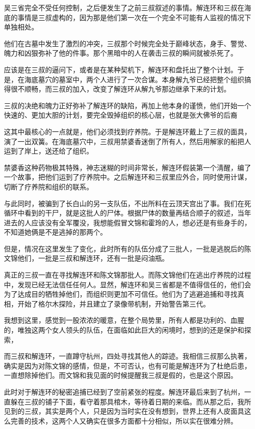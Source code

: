 吴三省完全不受任何控制，之后便发生了之前三叔叙述的事情。解连环和三叔在海底的事情是三叔虚构的，因为那是他们第一次在一个完全不可能有人监视的情况下单独相处。

他们在古墓中发生了激烈的冲突，三叔那个时候完全处于巅峰状态，身手、警觉、魄力和凶狠弥补了他的件事。那个黑暗中的人在袭击三叔的瞬间就被杀死了。

应该是在三叔的逼问下，或者是在某种契机下，解连环和盘托出了整个计划。于是，在海底墓穴的墓室中，两个人进行了一次合谋。本身解九爷已经把整个组织搞得很不顺畅，而三叔的加入，改变了解连环从解九爷那边继承下来的计划。

三叔的决绝和魄力正好弥补了解连环的缺陷，再加上他本身的谨愤，他们开始一个快速的、更加大胆的计划，要完全毁掉组织的核心层，也就是张大佛爷的后裔

这其中最核心的一点就是，他们必须找到疗养院。于是解连环戴上了三叔的面具，演了一出双簧。在海底墓穴中，三叔用禁婆香迷倒了所有人，然后用解家的船把人运到了岸上，送还给了组织。

禁婆香这种药物极其特殊，神志迷糊的时间非常长，解连环假装第一个淸醒，编了一个故事，把他们运到了疗养院中。之后解连环和三叔里应外合，同时使用计谋，切断了疗养院和组织的联系。

与此同时，被骗到了长白山的另一支队伍，不出所料在云顶天宫出了事。我们在死循环中看到的干尸，就是这批人的尸体。根据尸体的数量再结合顺子的叙述，当年进去的人应该没有全军覆没，我想能假冒文锦和霍玲的人，想必还是有些身手的，不知道她俩是不是逃掉的那两个。

但是，情况在这里发生了变化，此时所有的队伍分成了三批人，一批是逃脱后的陈文锦他们，一批是三叔和解连环，还有一批是闷油瓶。

真正的三叔一直在寻找解连环和陈文锦那批人。而陈文锦他们在逃出疗养院的过程中，发现已经无法信任任何人。显然，解连环和吴三省都是不值得信任的，他们会为了达成目的牺牲掉他们，而组织则更加不可信任。他们为了逃避追捕和寻找真相，开始了格尔木探险，并且建立了录像带机制，开始警告第三代。

我想到这里，感觉到一股浓浓的暖意，在整个局势里，所有人都是功利的、血腥的，唯独这两个女人领头的队伍，在面临如此巨大的闲境时，想到的还是保护和探索，

而三叔和解连环，一直蹲守杭州，四处寻找其他人的踪迹。我相信三叔那么执著，确实是因为对陈文锦的感情，但是，不可否认，也有可能是解连环为了杜绝后患，一直想除掉他们。而文锦和我见面的时候提醒我三叔是假的，也是这个原因。

此时对于解连环的秘密追捕已经到了空前紧张的程度。解连环最后来到了杭州，一直躲在三叔的铺子下面，看守着那具棺木，等待着日期的来临。而从那之后，我所见到的三叔，其实是两个人，只是因为当时实在没有想到，世界上还有人皮面具这么完善的技术，这两个人又确实在很多方面都十分相似，所以实在很难分辨。

